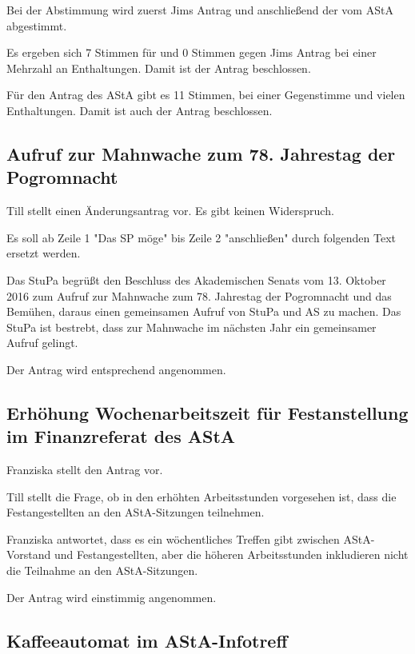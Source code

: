 \documentclass[ngerman,headheight=70pt]{scrartcl}
\begin{document}
    Bei der Abstimmung wird zuerst Jims Antrag und anschließend der vom AStA
    abgestimmt.

    Es ergeben sich 7 Stimmen für und 0 Stimmen gegen Jims Antrag bei einer
    Mehrzahl an Enthaltungen. Damit ist der Antrag beschlossen.

    Für den Antrag des AStA gibt es 11 Stimmen, bei einer Gegenstimme und vielen
    Enthaltungen. Damit ist auch der Antrag beschlossen.

    \subsection{Aufruf zur Mahnwache zum 78. Jahrestag der Pogromnacht}

    Till stellt einen Änderungsantrag vor. Es gibt keinen Widerspruch.

    Es soll ab Zeile 1 "Das SP möge" bis Zeile 2 "anschließen" durch folgenden
    Text ersetzt werden.

    \begin{blockquote}
        Das StuPa begrüßt den Beschluss des Akademischen Senats vom 13. Oktober
        2016 zum Aufruf zur Mahnwache zum 78. Jahrestag der Pogromnacht und das
        Bemühen, daraus einen gemeinsamen Aufruf von StuPa und AS zu machen.
        Das StuPa ist bestrebt, dass zur Mahnwache im nächsten Jahr ein gemeinsamer
        Aufruf gelingt.
    \end{blockquote}

    Der Antrag wird entsprechend angenommen.

    \subsection{Erhöhung Wochenarbeitszeit für Festanstellung im Finanzreferat des AStA}

    Franziska stellt den Antrag vor.

    Till stellt die Frage, ob in den erhöhten Arbeitsstunden vorgesehen ist,
    dass die Festangestellten an den AStA-Sitzungen teilnehmen.

    Franziska antwortet, dass es ein wöchentliches Treffen gibt zwischen AStA-Vorstand
    und Festangestellten, aber die höheren Arbeitsstunden inkludieren nicht
    die Teilnahme an den AStA-Sitzungen.

    Der Antrag wird einstimmig angenommen.

    \subsection{Kaffeeautomat im AStA-Infotreff}
\end{document}

